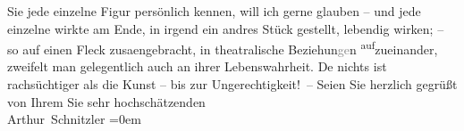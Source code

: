                     Sie jede einzelne Figur persönlich kennen, {\pb}will ich
                    gerne glauben – und jede einzelne wirkte am Ende, in irgend ein andres Stück
                    gestellt, lebendig wirken; – so auf einen Fleck zusa{\geminationm}engebracht, in theatralische Beziehun\textcolor{gray}{ge}n \substVorne{}\textsuperscript{auf}\substDazwischen{}zu\substHinten{}einander, zweifelt man gelegentlich auch an ihrer Lebenswahrheit. De{\geminationn} nichts ist rachsüchtiger als die Kunst – bis zur
                    Ungerechtigkeit! –\pend
           \pstart
           Seien Sie herzlich gegrüßt von Ihrem Sie sehr hochschätzenden{\\[\baselineskip]}\spacefill\mbox{Arthur Schnitzler}\pend
           \leftskip=0em{}\endnumbering{}  
      